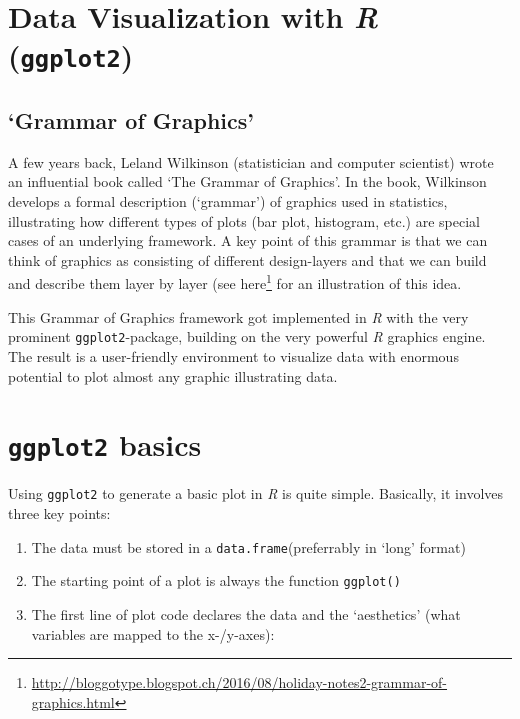 \documentclass[
  12pt,
]{style/krantz}
\providecommand{\tightlist}{%
  \setlength{\itemsep}{0pt}\setlength{\parskip}{0pt}}
\renewcommand{\href}[2]{#2\footnote{\url{#1}}}
\begin{document}
\hypertarget{data-visualization-with-r-ggplot2}{%
\section{\texorpdfstring{Data Visualization with \emph{R} (\texttt{ggplot2})}{Data Visualization with R (ggplot2)}}\label{data-visualization-with-r-ggplot2}}

\hypertarget{grammar-of-graphics}{%
\subsection{`Grammar of Graphics'}\label{grammar-of-graphics}}

A few years back, Leland Wilkinson (statistician and computer scientist) wrote an influential book called `The Grammar of Graphics'. In the book, Wilkinson develops a formal description (`grammar') of graphics used in statistics, illustrating how different types of plots (bar plot, histogram, etc.) are special cases of an underlying framework. A key point of this grammar is that we can think of graphics as consisting of different design-layers and that we can build and describe them layer by layer (see \href{http://bloggotype.blogspot.ch/2016/08/holiday-notes2-grammar-of-graphics.html}{here} for an illustration of this idea.

This Grammar of Graphics framework got implemented in \emph{R} with the very prominent \texttt{ggplot2}-package, building on the very powerful \emph{R} graphics engine. The result is a user-friendly environment to visualize data with enormous potential to plot almost any graphic illustrating data.

\hypertarget{ggplot2-basics}{%
\section{\texorpdfstring{\texttt{ggplot2} basics}{ggplot2 basics}}\label{ggplot2-basics}}

Using \texttt{ggplot2} to generate a basic plot in \emph{R} is quite simple. Basically, it involves three key points:

\begin{enumerate}
\def\labelenumi{\arabic{enumi}.}
\tightlist
\item
  The data must be stored in a \texttt{data.frame}(preferrably in `long' format)
\item
  The starting point of a plot is always the function \texttt{ggplot()}
\item
  The first line of plot code declares the data and the `aesthetics' (what variables are mapped to the x-/y-axes):
\end{enumerate}
\end{document}
